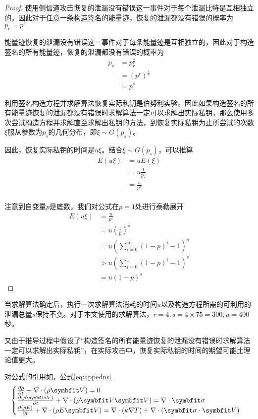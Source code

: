 {\begin{proof}
		
		使用侧信道攻击恢复的泄漏没有错误这一事件对于每个泄漏比特是互相独立的，因此对于任意一条构造签名的能量迹，恢复的泄漏都没有错误的概率为$p_r=p^r$
	
		能量迹恢复的泄漏没有错误这一事件对于每条能量迹是互相独立的，因此对于构造签名的所有能量迹，恢复的泄漏都没有错误的概率为\begin{align*}
			p_s&=p_r^{\frac sr}\\
			&=\left(p^r \right) ^{\frac sr}\\
			&=p^s
		\end{align*}
	
		利用签名构造方程并求解算法恢复实际私钥是伯努利实验。因此如果构造签名的所有能量迹恢复的泄漏都没有错误时求解算法一定可以求解出实际私钥，那么使用多次尝试构造方程并求解直至求解出私钥的方法，到恢复实际私钥为止所尝试的次数$\xi$服从参数为$p_s$的几何分布，即$\xi\sim G(p_s)$。
		
		因此，恢复实际私钥的时间是$u\xi$。结合$\xi\sim G(p_s)$，可以推算\begin{align*}
			E(u\xi)&=uE(\xi)\\
			&=u\frac{1}{p_s}\\
			&=\frac{u}{p^s}\\
		\end{align*}
	
		注意到自变量$p$是底数，我们对公式在$p=1$处进行泰勒展开\begin{align*}
			E(u\xi)&=\frac{u}{p^s}\\
			&=u\left( \frac1p\right) ^s\\
			&=u\left( \sum\limits_{i=0}^{\infty}\left( 1-p\right) ^i-1\right) ^s\\
			&>u\left( \sum\limits_{i=0}^{1}\left( 1-p\right) ^i-1\right) ^s\\
			&=u\left( 1-p\right) ^s
		\end{align*}

	\end{proof}
	当求解算法确定后，执行一次求解算法消耗的时间$u$以及构造方程所需的可利用的泄漏总量$s$保持不变。对于本文使用的求解算法，$r=4,s=4\times75=300,u=400$秒。%
	
	又由于推导过程中假设了“构造签名的所有能量迹恢复的泄漏没有错误时求解算法一定可以求解出实际私钥”，在实际攻击中，恢复实际私钥的时间的期望可能比理论值更大。

对公式的引用如，公式\eqref{eq:appedns}
\begin{equation} \label{eq:appedns}
    \begin{cases}
        \frac{\partial \rho}{\partial t} + \nabla\cdot(\rho\Vector{V}) = 0\\
        \frac{\partial (\rho\Vector{V})}{\partial t} + \nabla\cdot(\rho\Vector{V}\Vector{V}) = \nabla\cdot\Tensor{\sigma}\\
        \frac{\partial (\rho E)}{\partial t} + \nabla\cdot(\rho E\Vector{V}) = \nabla\cdot(k\nabla T) + \nabla\cdot(\Tensor{\sigma}\cdot\Vector{V})
    \end{cases}
\end{equation}

}
